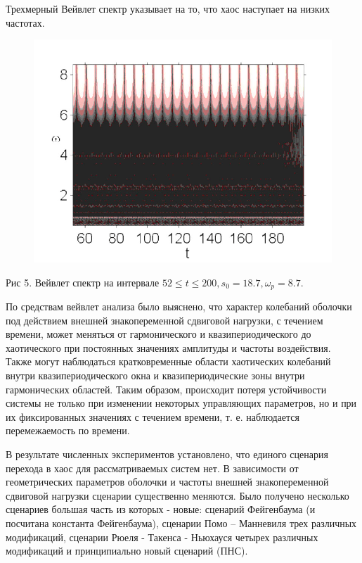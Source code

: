 \documentclass[12pt,letterpaper]{extreport}
\begin{document}
\par Трехмерный Вейвлет спектр указывает на то, что хаос наступает на низких 
частотах.

\begin{center}
\begin{figure}
\centering
\includegraphics[scale=0.5]{ris5}
\end{figure}
Рис 5. Вейвлет спектр на интервале $52\leq t \leq 200, s_0=18.7, \omega_p = 
8.7.$
\end{center}

\par По средствам вейвлет анализа было выяснено, что характер колебаний 
оболочки под действием внешней знакопеременной сдвиговой нагрузки, с течением 
времени, может меняться от гармонического и квазипериодического до хаотического
при постоянных значениях амплитуды и частоты воздействия. Также могут 
наблюдаться кратковременные области хаотических колебаний
внутри квазипериодического окна и квазипериодические зоны внутри гармонических 
областей. Таким образом, происходит потеря устойчивости системы не только при 
изменении некоторых управляющих параметров, но и при их фиксированных значениях
с течением времени, т. е. наблюдается перемежаемость по времени.

\par В результате численных экспериментов установлено, что единого сценария
перехода в хаос для рассматриваемых систем нет. В зависимости от геометрических
параметров оболочки и частоты внешней знакопеременной сдвиговой нагрузки
сценарии существенно меняются. Было получено несколько сценариев большая часть
из которых - новые: сценарий Фейгенбаума (и посчитана константа Фейгенбаума),
сценарии Помо – Манневиля трех различных модификаций, сценарии Рюеля - Такенса
- Ньюхауся четырех различных модификаций и принципиально новый сценарий 
(ПНС).\\
\end{document}
